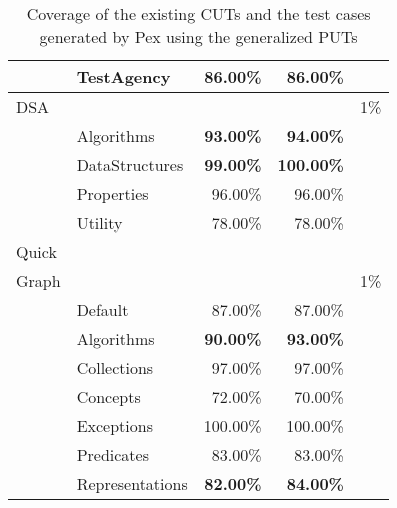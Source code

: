 \begin{table}[t]
\begin{tabular}{|l|l|r|r|c|}
						& TestAgency 							&  86.00\%					&  86.00\%					& 		\\ \cline{2-4}
\hline
\hline
DSA 				& \multicolumn{3}{|c|}{} 																					& 1\% \\ \hline
						& Algorithms							& \textbf{93.00\%}	&  \textbf{94.00\%}	& 		\\ \cline{2-4}
						& DataStructures					& \textbf{99.00\%}	& \textbf{100.00\%}	&			\\ \cline{2-4}
						& Properties							& 96.00\%						&  96.00\%					& 		\\ \cline{2-4}
						& Utility 								& 78.00\% 					&  78.00\%					&			\\ \cline{2-4}
\hline
\hline
Quick				& \multicolumn{3}{|c|}{} 														  						&			\\ 
Graph				& \multicolumn{3}{|c|}{} 																					&	1\%	\\ \hline
						& Default									& 87.00\%						&  87.00\%					& 		\\ \cline{2-4}
						& Algorithms							& \textbf{90.00\%}	&  \textbf{93.00\%}	&			\\ \cline{2-4}
						& Collections							& 97.00\%						&  97.00\%					& 		\\ \cline{2-4}
						& Concepts 								& 72.00\% 					&  70.00\%					&			\\ \cline{2-4}
						& Exceptions 							&100.00\% 					& 100.00\%					&			\\ \cline{2-4}
						& Predicates 							& 83.00\% 					&  83.00\%					&			\\ \cline{2-4}
						& Representations					& \textbf{82.00\%}	&  \textbf{84.00\%} &			\\ \cline{2-4}
\hline
\hline
\end{tabular}
\caption{Coverage of the existing CUTs and the test cases generated by Pex using the generalized PUTs}
\label{tab:coverage}
\end{table}

